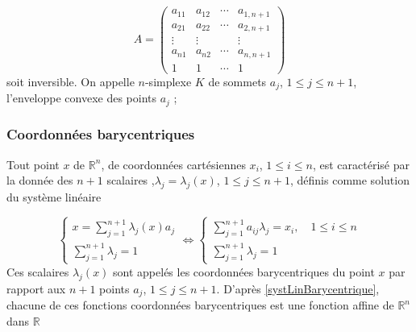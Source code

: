 \documentclass{beamer}
\begin{document}
\begin{frame}
\begin{equation}
A=\left(\begin{array}{llll}
a_{11} & a_{12} & \cdots & a_{1,n+1} \\ 
a_{21} & a_{22} & \cdots & a_{2,n+1} \\ 
\vdots& \vdots &  & \vdots \\ 
a_{n1} & a_{n2} & \cdots & a_{n,n+1} \\ 
1 & 1 & \cdots & 1
\end{array}\right)
\end{equation}
soit inversible. On appelle $n$-simplexe $K$ de sommets $a_j$, $1\leq j\leq n+1$,                                                                                                         l'enveloppe convexe des points $a_j$ ; 
\end{frame}

\begin{frame}
\frametitle{Coordonnées barycentriques}
  Tout point $x$ de $\mathbb{R}^n$, de coordonnées cartésiennes $x_i$, $1\leq i\leq n$, est caractérisé par la donnée des $n+ 1$ scalaires ,$\lambda_j=\lambda_j(x)$, $1\leq j \leq n+1$, définis comme solution du système linéaire

\begin{equation}
\left\{\begin{array}{l}
\displaystyle x=\sum_{j=1}^{n+1}\lambda_j(x) a_{j}\\
\displaystyle \sum_{j=1}^{n+1}\lambda_j =1
\end{array}\right.
\Longleftrightarrow
\left\{\begin{array}{l}
\displaystyle \sum_{j=1}^{n+1}a_{ij}\lambda_j =x_i, \quad 1\leq i\leq n\\
\displaystyle \sum_{j=1}^{n+1}\lambda_j =1
\end{array}\right.
\label{systLinBarycentrique}
\end{equation}
Ces scalaires $\lambda_j(x)$ sont  appelés les coordonnées barycentriques du point $x$ par rapport aux $n+ 1$ points 
$a_j$, $1\leq j\leq n+1$. D'après \eqref{systLinBarycentrique}, chacune de ces fonctions coordonnées barycentriques est une fonction affine de $\mathbb{R}^n$ dans $\mathbb{R}$

\end{frame}
\end{document}
